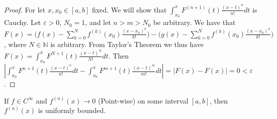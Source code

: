 \documentclass[crop=false,class=book,oneside]{standalone}
\begin{document}
        \begin{proof}
        For let $x,x_0\in [a,b]$ fixed. We will show that $\int_{x_0}^{x} F^{(n+1)}(t)\frac{(x-t)^{n}}{n!}dt$ is Cauchy. Let $\varepsilon>0$, $N_0 = 1$, and let $n>m>N_0$ be arbitrary. We have that $F(x) = \bigg(f(x)-\sum_{k=0}^{N} f^{(k)}(x_0)\frac{(x-x_0)^{k}}{k!}\bigg)-\bigg(g(x)-\sum_{k=0}^{N} f^{(k)}(x_0)\frac{(x-x_0)^{k}}{k!}\bigg)$, where $N\in \mathbb{N}$ is arbitrary. From Taylor's Theorem we thus have $F(x) = \int_{x_0}^{x}F^{N+1}(t)\frac{(x-t)^N}{N!}dt$. Then $|\int_{x_0}^{x}F^{n+1}(t)\frac{(x-t)^n}{n!}dt-\int_{x_0}^{x}F^{m+1}(t)\frac{(x-t)^m}{m!}dt| = |F(x)-F(x)|= 0 <\varepsilon$. 
        \end{proof}
        \begin{theorem}
        If $f\in C^{\infty}$ and $f^{(n)}(x)\rightarrow 0$ (Point-wise) on some interval $[a,b]$, then $f^{(n)}(x)$ is uniformly bounded.
        \end{theorem}
\end{document}
